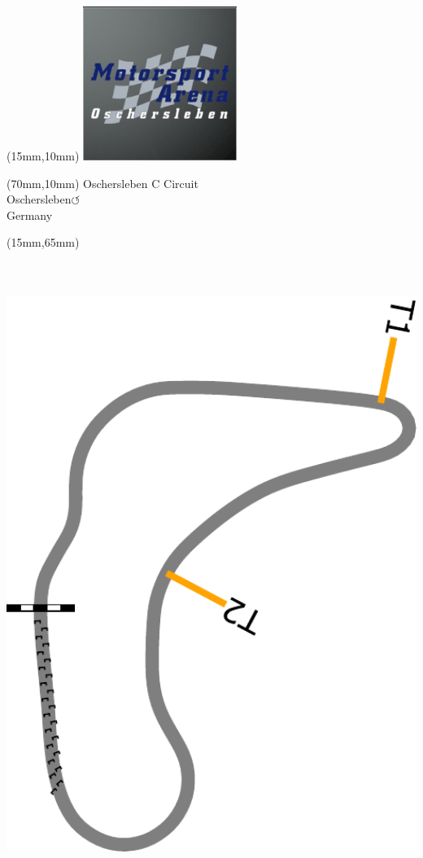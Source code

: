 \null\newpage
\begin{textblock*}{50mm}(15mm,10mm)%
\includegraphics[width=50mm]{LG/2015-05-20_00090.png}
\end{textblock*}
\begin{textblock*}{130mm}(70mm,10mm)%
{\fontsize{20}{20}\selectfont Oschersleben C Circuit\\}
{\fontsize{16}{16}\selectfont Oschersleben\hfill \huge$\circlearrowleft$\\}
{\fontsize{12}{12}\selectfont Germany\\}
\end{textblock*}
\begin{textblock*}{185mm}(15mm,65mm)%
\centering
\mbox{\includegraphics[width=185mm,height=210mm,keepaspectratio]{PT/OSCI.pdf}}
\end{textblock*}
